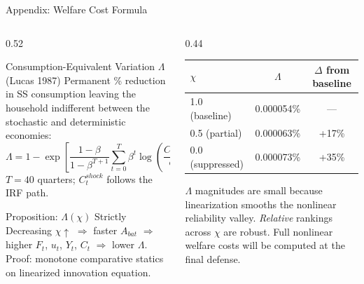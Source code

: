 \documentclass[aspectratio=169,10pt]{beamer}
\begin{document}
\begin{frame}{Appendix: Welfare Cost Formula}
  \begin{columns}[T]
    \begin{column}{0.52\textwidth}
      \begin{block}{Consumption-Equivalent Variation $\Lambda$ (Lucas 1987)}
        \scriptsize Permanent \% reduction in SS consumption leaving the household indifferent between the stochastic and deterministic economies:
        \[
          \Lambda = 1 - \exp\!\left[\frac{1-\beta}{1-\beta^{T+1}}\sum_{t=0}^{T}\beta^t
          \log\!\left(\frac{C_t^{shock}}{C_{ss}}\right)\right]
        \]
        $T=40$ quarters; $C_t^{shock}$ follows the IRF path.
      \end{block}
      \vspace{0.2em}
      \begin{block}{Proposition: $\Lambda(\chi)$ Strictly Decreasing}
        \scriptsize $\chi\uparrow$ $\Rightarrow$ faster $A_{bat}$ $\Rightarrow$ higher $F_t$, $u_t$, $Y_t$, $C_t$ $\Rightarrow$ lower $\Lambda$.\\[2pt]
        Proof: monotone comparative statics on linearized innovation equation.
      \end{block}
    \end{column}
    \begin{column}{0.44\textwidth}
      \begin{goldbox}[title=Preliminary Result]
        \small
        \begin{tabular}{@{}lcc@{}}
          \toprule
          $\chi$ & $\Lambda$ & $\Delta$ from baseline\\
          \midrule
          1.0 (baseline)   & 0.000054\% & ---\\
          0.5 (partial)    & 0.000063\% & +17\%\\
          0.0 (suppressed) & 0.000073\% & +35\%\\
          \bottomrule
        \end{tabular}
      \end{goldbox}
      \vspace{0.2em}
      \begin{alertbox}[title=Interpretation Caveat]
        \scriptsize $\Lambda$ magnitudes are small because linearization smooths the nonlinear reliability valley. \textit{Relative} rankings across $\chi$ are robust. Full nonlinear welfare costs will be computed at the final defense.
      \end{alertbox}
    \end{column}
  \end{columns}
\end{frame}
\end{document}
